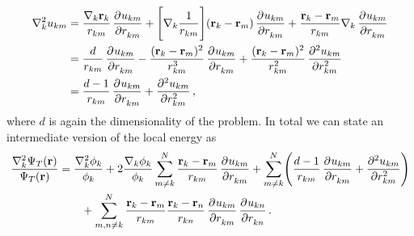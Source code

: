 \documentclass[
    a4paper, aps, twocolumn, floatfix, superscriptaddress]{revtex4-1}
\newcommand{\vf}{\mathbf}
\newcommand{\1}{\mathds{1}}
\begin{document}
            \begin{widetext}
                \begin{align}
                    \nabla_k^2 u_{km}
                    &=
                    \frac{\nabla_k \vf{r}_k}{r_{km}}\dpd[]{u_{km}}{r_{km}}
                    + \Biggl[
                        \nabla_k \frac{1}{r_{km}}
                    \Biggr]
                    (\vf{r}_k - \vf{r}_m)\dpd[]{u_{km}}{r_{km}}
                    + \frac{\vf{r}_k - \vf{r}_m}{r_{km}}
                    \nabla_k \dpd[]{u_{km}}{r_{km}} \\
                    &= \frac{d}{r_{km}}\dpd[]{u_{km}}{r_{km}}
                    - \frac{(\vf{r}_k - \vf{r}_m)^2}{r_{km}^3}
                    \dpd[]{u_{km}}{r_{km}}
                    + \frac{(\vf{r}_k - \vf{r}_m)^2}{r_{km}^2}
                    \dpd[2]{u_{km}}{r_{km}} \\
                    &=
                    \frac{d - 1}{r_{km}}\dpd[]{u_{km}}{r_{km}}
                    + \dpd[2]{u_{km}}{r_{km}},
                \end{align}
                where $d$ is again the dimensionality of the problem. In total
                we can state an intermediate version of the local energy as
                \begin{align}
                    \frac{\nabla_k^2\Psi_T(\vf{r})}{\Psi_T(\vf{r})}
                    &=
                    \frac{\nabla_k^2\phi_k}{\phi_k}
                    + 2\frac{\nabla_k\phi_k}{\phi_k}
                    \sum_{m \neq k}^N
                    \frac{\vf{r}_k - \vf{r}_m}{r_{km}}
                    \dpd[]{u_{km}}{r_{km}}
                    + \sum_{m\neq k}^N
                    \Biggl(
                        \frac{d - 1}{r_{km}}\dpd[]{u_{km}}{r_{km}}
                        + \dpd[2]{u_{km}}{r_{km}}
                    \Biggr)
                    \nonumber \\
                    &\qquad
                    +
                    \sum_{m, n \neq k}^N
                    \frac{\vf{r}_k - \vf{r}_m}{r_{km}}
                    \frac{\vf{r}_k - \vf{r}_n}{r_{kn}}
                    \dpd[]{u_{km}}{r_{km}}
                    \dpd[]{u_{kn}}{r_{kn}}.
                \end{align}
            \end{widetext}
\end{document}
